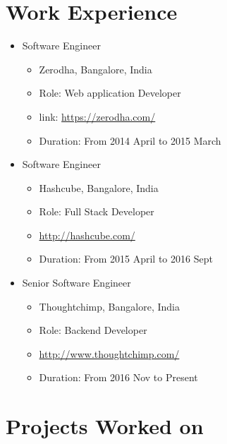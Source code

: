 \documentclass[11pt,a4paper]{moderncv}
\begin{document}
\section{Work Experience}
    \begin{itemize}
        \item Software Engineer
        \begin{itemize}
            \item Zerodha, Bangalore, India
            \item Role: Web application Developer
            \item link: {\url{https://zerodha.com/}}
            \item Duration: From 2014 April to 2015 March 
        \end{itemize}
    \end{itemize}
    \begin{itemize}
        \item Software Engineer
        \begin{itemize}
            \item Hashcube, Bangalore, India
            \item Role: Full Stack Developer  
            \item {\url{http://hashcube.com/}}
            \item Duration: From 2015 April to 2016 Sept
        \end{itemize}
    \end{itemize}
    \begin{itemize}
        \item Senior Software Engineer
        \begin{itemize}
            \item Thoughtchimp, Bangalore, India
            \item Role: Backend Developer
            \item {\url{http://www.thoughtchimp.com/}}
            \item Duration: From 2016 Nov to Present 
        \end{itemize}
    \end{itemize}
 
\pagebreak
\section{Projects Worked on}
\end{document}
